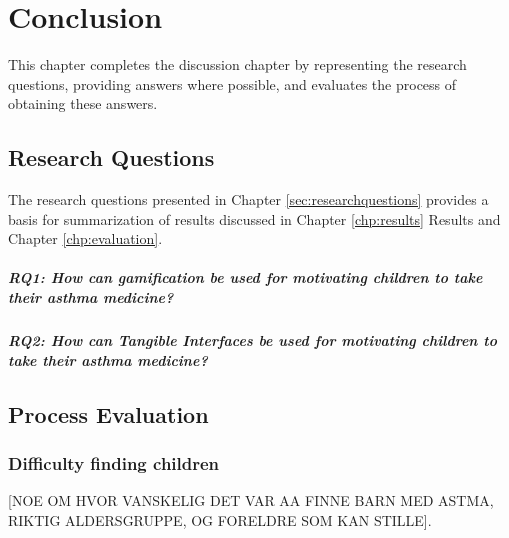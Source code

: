 \chapter{Conclusion}
\label{chp:masterconclusion}

This chapter completes the discussion chapter by representing the research questions, providing answers where possible, and evaluates the process of obtaining these answers. 

\section{Research Questions}

The research questions presented in Chapter \ref{sec:researchquestions} provides a basis for summarization of results discussed in Chapter \ref{chp:results} Results and Chapter \ref{chp:evaluation}. 

\paragraph{RQ1: How can gamification be used for motivating children to take their asthma medicine?}



\paragraph{RQ2: How can Tangible Interfaces be used for motivating children to take their asthma medicine?}



\section{Process Evaluation}

\subsection{Difficulty finding children}
[NOE OM HVOR VANSKELIG DET VAR AA FINNE BARN MED ASTMA, RIKTIG ALDERSGRUPPE, OG FORELDRE SOM KAN STILLE].  
